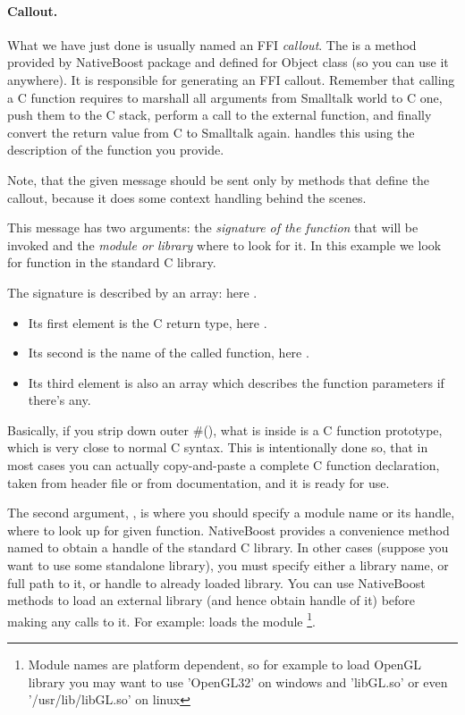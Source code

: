 \documentclass[a4paper,10pt,twoside]{book}
\begin{document}
\paragraph{Callout.}
What we have just done is usually named an FFI \emph{callout}. 
The  is a method provided by NativeBoost package and defined for Object class (so you can use it anywhere).
It is responsible for generating an FFI callout. Remember that calling a C function requires to marshall all arguments from Smalltalk world to C one, push them to the C stack, perform a call to the external function, and finally convert the return value from C to Smalltalk again.  handles this using the description of the function you provide.

Note, that the given message  should be sent only by methods that define the callout, because it does some context handling behind the scenes.

This message has two arguments: the \emph{signature of the function} that will be invoked and the \emph{module or library} where to look for it.  In this example we look for  function in the standard C library. 

The signature is described by an array: here .
\begin{itemize} 
\item Its first element is the C return type, here .
\item Its second is the name of the called function, here .
\item Its third element is also an array which describes the function parameters if there's any. 
\end{itemize}

Basically, if you strip down outer \#(), what is inside is a C function prototype, which is very close to normal C syntax. This is intentionally done so,
that in most cases you can actually copy-and-paste a complete C function declaration, taken from header file or from documentation, and it is ready for use.

The second argument, , is where you should specify a module name or its handle, where to look up for given function.
NativeBoost provides a convenience method named 
to obtain a handle of the standard C library. In other cases (suppose you want to use some standalone library), you must specify either a library name, or full path to it, or handle to already loaded library. You can use
NativeBoost methods  to load an external library (and hence obtain handle of it) before making any calls to it. For example:  loads the module \footnote{Module names are platform dependent, so for example to load OpenGL library you may want to use 'OpenGL32' on windows and 'libGL.so' or even '/usr/lib/libGL.so' on linux }.
\end{document}
